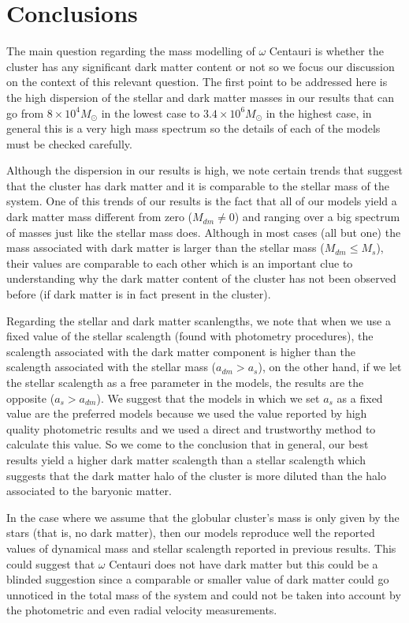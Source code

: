\chapter{Conclusions}

The main question regarding the mass modelling of $\omega$ Centauri is whether the cluster has any significant dark matter content or not so we focus our discussion on the context of this relevant question. The first point to be addressed here is the high dispersion of the stellar and dark matter masses in our results that can go from $8 \times 10^{4} M_{\odot}$ in the lowest case to $3.4 \times 10^{6} M_{\odot}$ in the highest case, in general this is a very high mass spectrum so the details of each of the models must be checked carefully.

Although the dispersion in our results is high, we note certain trends that suggest that the cluster has dark matter and it is comparable to the stellar mass of the system. One of this trends of our results is the fact that all of our models yield a dark matter mass different from zero ($M_{dm}\neq 0$) and ranging over a big spectrum of masses just like the stellar mass does. Although in most cases (all but one) the mass associated with dark matter is larger than the stellar mass ($M_{dm}\leq M_{s}$), their values are comparable to each other which is an important clue to understanding why the dark matter content of the cluster has not been observed before (if dark matter is in fact present in the cluster).

Regarding the stellar and dark matter scanlengths, we note that when we use a fixed value of the stellar scalength (found with photometry procedures), the scalength associated with the dark matter component is higher than the scalength associated with the stellar mass ($a_{dm} > a_{s}$), on the other hand, if we let the stellar scalength as a free parameter in the models, the results are the opposite ($a_{s} > a_{dm}$). We suggest that the models in which we set $a_{s}$ as a fixed value are the preferred models because we used the value reported by high quality photometric results and we used a direct and trustworthy method to calculate this value. So we come to the conclusion that in general, our best results yield a higher dark matter scalength than a stellar scalength which suggests that the dark matter halo of the cluster is more diluted than the halo associated to the baryonic matter.

In the case where we assume that the globular cluster's mass is only given by the stars (that is, no dark matter), then our models reproduce well the reported values of dynamical mass and stellar scalength reported in previous results. This could suggest that $\omega$ Centauri does not have dark matter but this could be a blinded suggestion since a comparable or smaller value of dark matter could go unnoticed in the total mass of the system and could not be taken into account by the photometric and even radial velocity measurements.   

